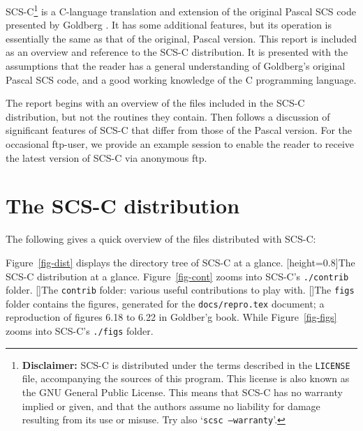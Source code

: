 SCS-C\footnote{{\bf Disclaimer:} SCS-C is distributed under the terms
described in the {\tt LICENSE} file, accompanying the sources of this
program. This license is also known as the GNU General Public License.
This means that SCS-C has no warranty implied or given, and that the
authors assume no liability for damage resulting from its use or misuse.
Try also `{\tt scsc --warranty}'.} 
is a C-language translation and extension of the original
Pascal SCS code presented by Goldberg \citeyear{Goldberg:89e}. 
It has some additional features, but its operation is 
essentially the same as that of the original, Pascal version. 
This report is included as an overview and reference to the SCS-C distribution.
It is presented with the assumptions that the reader has a general
understanding of Goldberg's original Pascal SCS code, and a good working
knowledge of the C programming language.

The report begins with an overview of the files included in the SCS-C
distribution, but not the routines they contain. 
Then follows a discussion of significant features of SCS-C
that differ from those of the Pascal version.
For the occasional ftp-user, we provide an example session to enable
the reader to receive the latest version of SCS-C via anonymous ftp.


\section{The SCS-C distribution}
\label{dist}

The following gives a quick overview of the files distributed
with SCS-C:


Figure~\ref{fig-dist} displays the directory tree of SCS-C at a glance.
[height=0.8\textheight]{The SCS-C distribution
at a glance.}
Figure~\ref{fig-cont} zooms into SCS-C's {\tt ./contrib} folder.
[]{The {\tt contrib} folder:
various useful contributions to play with.}
[]{The {\tt figs} folder contains the figures,
generated for the {\tt docs/repro.tex} document; a reproduction of
figures 6.18 to 6.22 in Goldber'g book.}
While Figure~\ref{fig-figs} zooms into SCS-C's {\tt ./figs} folder.


